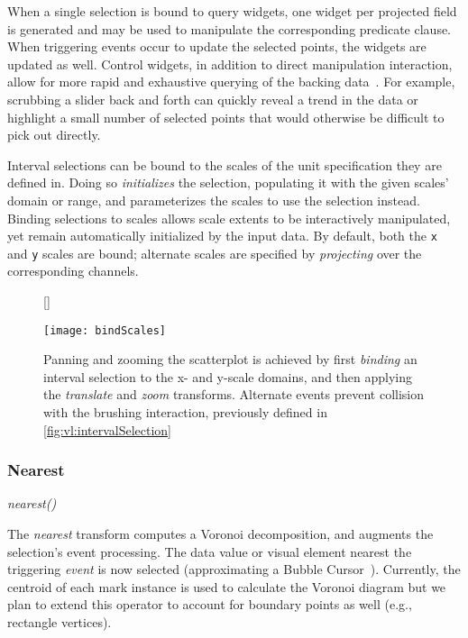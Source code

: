 When a single selection is bound to query widgets, one widget per projected
field is generated and may be used to manipulate the corresponding predicate
clause. When triggering events occur to update the selected points, the widgets
are updated as well. Control widgets, in addition to direct manipulation
interaction, allow for more rapid and exhaustive querying of the backing
data~\cite{shneiderman:dynamicqueries}. For example, scrubbing a slider back and
forth can quickly reveal a trend in the data or highlight a small number of
selected points that would otherwise be difficult to pick out directly.

Interval selections can be bound to the scales of the unit specification they
are defined in. Doing so \emph{initializes} the selection, populating it with
the given scales' domain or range, and parameterizes the scales to use the
selection instead. Binding selections to scales allows scale extents to be
interactively manipulated, yet remain automatically initialized by the input
data. By default, both the \texttt{x} and \texttt{y} scales are bound; alternate
scales are specified by \emph{projecting} over the corresponding channels.

\begin{figure}[h!]
[\FBwidth]
{\caption{Panning and zooming the scatterplot is achieved by first
\emph{binding} an interval selection to the x- and y-scale domains, and then
applying the \emph{translate} and \emph{zoom} transforms. Alternate events
prevent collision with the brushing interaction, previously defined in
\cref{fig:vl:intervalSelection}}
\label{fig:vl:bindScales}}
{\texttt{[image: bindScales]}}
\end{figure}

\subsubsection{Nearest}

\centerline{\emph{nearest()}}

The \emph{nearest} transform computes a Voronoi decomposition, and augments the
selection's event processing. The data value or visual element nearest the
triggering \emph{event} is now selected (approximating a Bubble
Cursor~\cite{grossman:bubble}). Currently, the centroid of each mark instance is
used to calculate the Voronoi diagram but we plan to extend this operator to
account for boundary points as well (e.g., rectangle vertices).

